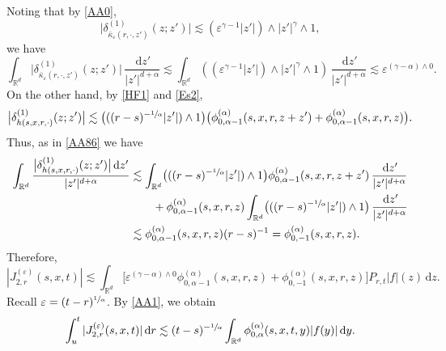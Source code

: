 \documentclass[11pt]{article}
\numberwithin{equation}{section}\providecommand{\asymp}{\mathrel{\sim}}
\theoremstyle{plain}
\theoremstyle{definition}
\let\eps\varepsilon
\newcommand\mR{\mathbb{R}}
\newcommand\1{{\mathbf{1}}}
\newcommand{\dif}{\,\mathrm{d}}
\begin{document}
Noting that by \eqref{AA0},\vspace*{-3pt}
\[
\bigl|\delta^{(1)}_{\bar\kappa_\eps(r,\cdot,z')}(z;z')\bigr|\lesssim (\eps^{\gamma-1}|z'|)\wedge|z'|^\gamma\wedge 1,
\]
we have
\begin{equation*}
\int_{\mR^d}\bigl|\delta^{(1)}_{\bar\kappa_\eps(r,\cdot,z')}(z;z')\bigr|\,\frac{\dif z'}{|z'|^{d+\alpha}}\lesssim
\int_{\mR^d}((\eps^{\gamma-1}|z'|)\wedge|z'|^\gamma\wedge 1)\,\frac{\dif z'}{|z'|^{d+\alpha}}\lesssim\eps^{(\gamma-\alpha)\wedge 0}.
\end{equation*}
On the other hand, by \eqref{HF1} and \eqref{Es2},
\begin{equation*}
\bigl|\delta^{(1)}_{h(s,x,r,\cdot)}(z;z')\bigr|\lesssim \bigl(((r-s)^{-\sfrac1\alpha}|z'|)\wedge 1\bigr)
\bigl(\phi^{(\alpha)}_{0,\alpha-1}(s,x,r,z+z')+\phi^{(\alpha)}_{0,\alpha-1}(s,x,r,z)\bigr).
\end{equation*}
Thus, as in \eqref{AA86} we have\vspace*{-3pt}
\begin{align*}
\int_{\mR^d}\frac{\bigl|\delta^{(1)}_{h(s,x,r,\cdot)}(z;z')\bigr|\dif z'}{|z'|^{d+\alpha}}
&\lesssim \int_{\mR^d}\bigl(((r-s)^{-\sfrac1\alpha}|z'|)\wedge 1\bigr)\phi^{(\alpha)}_{0,\alpha-1}(s,x,r,z+z')\,\frac{\dif z'}{|z'|^{d+\alpha}}\\
&\hspace*{.7cm}+\phi^{(\alpha)}_{0,\alpha-1}(s,x,r,z)\int_{\mR^d}\bigl(((r-s)^{-\sfrac1\alpha}|z'|)\wedge 1\bigr)\,\frac{\dif z'}{|z'|^{d+\alpha}}\\
&\lesssim \phi^{(\alpha)}_{0,\alpha-1}(s,x,r,z)(r-s)^{-1}=\phi^{(\alpha)}_{0,-1}(s,x,r,z).
\end{align*}
Therefore,\vspace*{-3pt}
\begin{equation*}
|J^{(\eps)}_{2,r}(s,x,t)|
\lesssim \int_{\mR^d}\Big[\eps^{
(\gamma-\alpha)\wedge 0
}\phi^{(\alpha)}_{0,\alpha-1}(s,x,r,z)
+\phi^{(\alpha)}_{0,-1}(s,x,r,z)\Big]P_{r,t}|f|(z)\dif z.
\end{equation*}
Recall $\eps=(t-r)^{\sfrac1\alpha}$. By \eqref{AA1}, we obtain\vspace*{-3pt}
\[
\int_{u}^t |J^{(\eps)}_{2,r}(s,x,t)|\dif r\lesssim(t-s)^{-\sfrac1\alpha}\int_{\mR^d}\phi^{(\alpha)}_{0,\alpha}(s,x,t,y)|f(y)|\dif y.
\]
\end{document}
